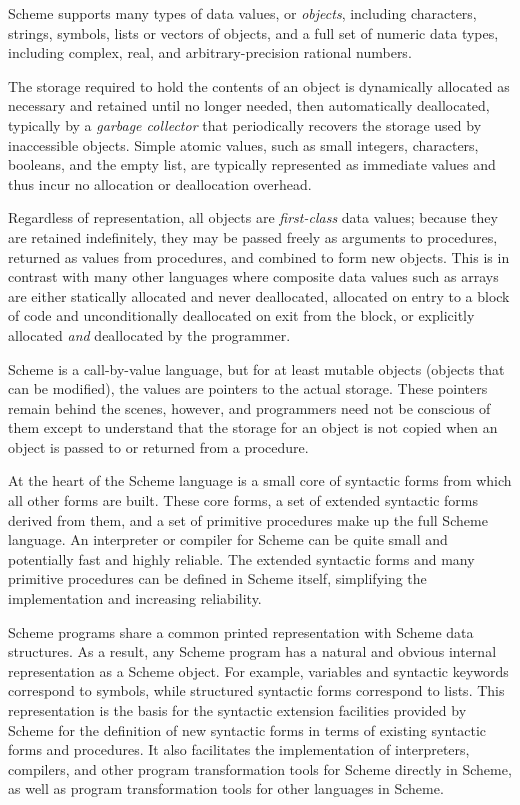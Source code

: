 Scheme supports many types of data values, or
\label{intro_s1}\textit{objects}, including characters, strings, symbols,
lists or vectors of objects, and a full set of numeric data types,
including complex, real, and arbitrary-precision rational numbers.


The storage required to hold the contents of an object is
\label{intro_s2}dynamically allocated as
necessary and retained until no longer needed, then automatically
deallocated, typically by a
\label{intro_s3}\textit{garbage collector} that
periodically recovers the storage used by inaccessible objects.
Simple atomic values, such as small integers, characters, booleans,
and the empty list, are typically represented as immediate values and
thus incur no allocation or deallocation overhead.


Regardless of representation,
all objects are \label{intro_s4}\textit{first-class} data values;
because they are retained indefinitely, they may be passed freely
as arguments to procedures, returned as values from procedures, and
combined to form new objects.
This is in contrast with many other languages where composite data
values such as arrays are either statically allocated and never
deallocated, allocated on entry to a block of code and unconditionally
deallocated on exit from the block, or explicitly allocated \textit{and}
deallocated by the programmer.


Scheme is a call-by-value language, but for at least mutable objects (objects
that can be modified), the values are \label{intro_s5}pointers
to the actual storage.
These pointers remain behind the scenes, however, and programmers need
not be conscious of them except to understand that the storage for an
object is not copied when an object is passed to or returned from
a procedure.


\label{intro_s6}At the heart of the Scheme language is a
small core of syntactic forms from which all other forms are built.
These core forms, a set of extended syntactic forms derived from
them, and a set of \label{intro_s7}primitive procedures
make up the full Scheme language.
An \label{intro_s8}interpreter or \label{intro_s9}compiler for Scheme
can be quite small and potentially fast and highly reliable.
The extended syntactic forms and many primitive procedures can be
defined in Scheme itself, simplifying the implementation and
increasing reliability.


Scheme programs share a common printed representation with Scheme
data structures.
As a result, any Scheme program has a natural and obvious internal
representation as a Scheme object.
For example, \label{intro_s10}variables and syntactic \label{intro_s11}keywords correspond to
symbols, while structured syntactic forms correspond to lists.
This representation is the basis for the syntactic extension
facilities
provided by Scheme for the definition of new syntactic
forms in terms of existing syntactic forms and procedures.
It also facilitates the implementation of interpreters, compilers, and
other program transformation tools for Scheme directly in Scheme, as
well as program transformation tools for other languages in Scheme.



